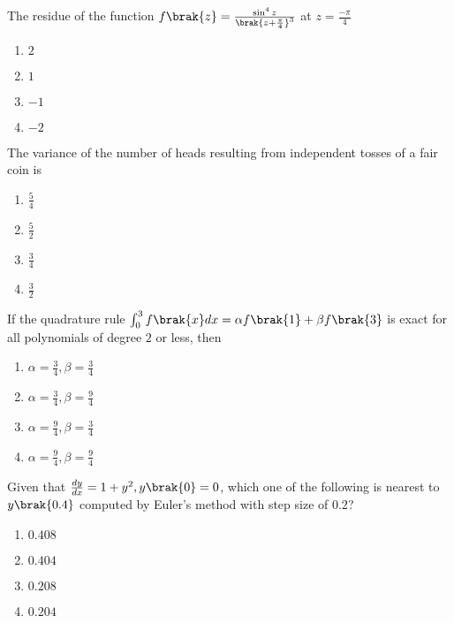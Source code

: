 \iffalse
	\title{2010-XE-14-26}
	\author{EE24Btech11006 - Arnav Mahishi}
	\section{xe}
	\chapter{2010}
\fi
\item{
The residue of the function $f\brak{z}=\frac{\sin^4z}{\brak{z+\frac{\pi}{4}}^3}$ at $z=\frac{-\pi}{4}$
\begin{multicols}{4}
\begin{enumerate}
\item $2$
\item $1$
\item $-1$ 
\item $-2$
\end{enumerate}
\end{multicols}
}
\item{
The variance of the number of heads resulting from independent tosses of a fair coin is
\begin{multicols}{2}
\begin{enumerate}
\item $\frac{5}{4}$ 
\item $\frac{5}{2}$
\item $\frac{3}{4}$
\item $\frac{3}{2}$
\end{enumerate}
\end{multicols}}
\item{
If the quadrature rule $\int_0^3f\brak{x}dx=\alpha f\brak{1}+\beta f\brak{3}$ is exact for all polynomials of degree $2$ or less, then
\begin{multicols}{4}
\begin{enumerate}
\item $\alpha=\frac{3}{4},\beta=\frac{3}{4}$
\item $\alpha=\frac{3}{4},\beta=\frac{9}{4}$
\item $\alpha=\frac{9}{4},\beta=\frac{3}{4}$
\item $\alpha=\frac{9}{4},\beta=\frac{9}{4}$
\end{enumerate}
\end{multicols}
}
\item{
Given that $\frac{dy}{dx}=1+y^2,y\brak{0}=0$, which one of the following is nearest to $y\brak{0.4}$ computed by Euler's method with step size of $0.2$?
\begin{multicols}{4}
\begin{enumerate}
\item $0.408$
\item $0.404$
\item $0.208$
\item $0.204$
\end{enumerate}
\end{multicols}
}
